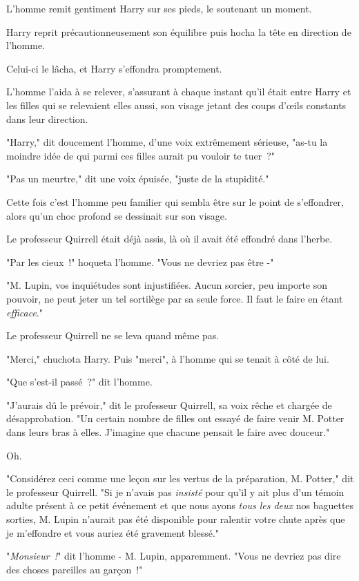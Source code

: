 L'homme remit gentiment Harry sur ses pieds, le soutenant un moment.

Harry reprit précautionneusement son équilibre puis hocha la tête en direction de l'homme.

Celui-ci le lâcha, et Harry s'effondra promptement.

L'homme l'aida à se relever, s'assurant à chaque instant qu'il était entre Harry et les filles qui se relevaient elles aussi, son visage jetant des coups d'œils constants dans leur direction.

"Harry," dit doucement l'homme, d'une voix extrêmement sérieuse, "as-tu la moindre idée de qui parmi ces filles aurait pu vouloir te tuer~?"

"Pas un meurtre," dit une voix épuisée, "juste de la stupidité."

Cette fois c'est l'homme peu familier qui sembla être sur le point de s'effondrer, alors qu'un choc profond se dessinait sur son visage.

Le professeur Quirrell était déjà assis, là où il avait été effondré dans l'herbe.

"Par les cieux~!" hoqueta l'homme. "Vous ne devriez pas être -"

"M. Lupin, vos inquiétudes sont injustifiées. Aucun sorcier, peu importe son pouvoir, ne peut jeter un tel sortilège par sa seule force. Il faut le faire en étant \emph{efficace}."

Le professeur Quirrell ne se leva quand même pas.

"Merci," chuchota Harry. Puis "merci", à l'homme qui se tenait à côté de lui.

"Que s'est-il passé~?" dit l'homme.

"J'aurais dû le prévoir," dit le professeur Quirrell, sa voix rêche et chargée de désapprobation. "Un certain nombre de filles ont essayé de faire venir M. Potter dans leurs bras à elles. J'imagine que chacune pensait le faire avec douceur."

Oh.

"Considérez ceci comme une leçon sur les vertus de la préparation, M. Potter," dit le professeur Quirrell. "Si je n'avais pas \emph{insisté} pour qu'il y ait plus d'un témoin adulte présent à ce petit événement et que nous ayons \emph{tous les deux} nos baguettes sorties, M. Lupin n'aurait pas été disponible pour ralentir votre chute après que je m'effondre et vous auriez été gravement blessé."

"\emph{Monsieur~!}" dit l'homme - M. Lupin, apparemment. "Vous ne devriez pas dire des choses pareilles au garçon~!"

